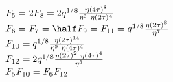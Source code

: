 \begin{equation}
  \begin{array}{l}
F_5 = 2 F_8 =  2q^{1/8} {\eta(4\tau)^8 \over \eta^3 ~\eta(2\tau)^4 } \\
F_6 = F_{7} = \half F_9 =F_{11} = q^{1/8} {\eta(2\tau)^8 \over \eta^7} \\
F_{10} =  q^{1/8} {\eta(2\tau)^{14} \over \eta^9 ~\eta(4\tau)^4}\\
F_{12} = 2q^{1/8} { \eta(2\tau)^2 ~\eta(4\tau)^4 \over \eta^5 }\\
F_5  F_{10} = F_6 F_{12}
  \end{array}
\end{equation}

